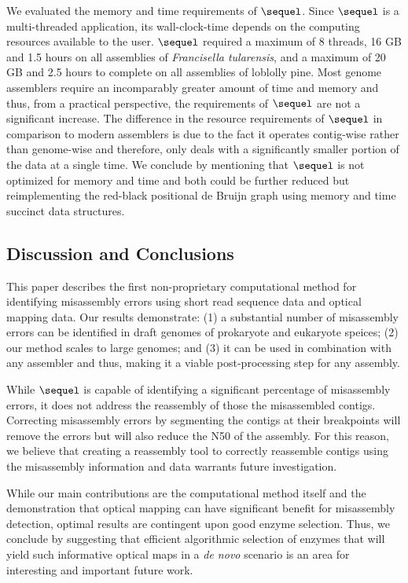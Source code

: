\documentclass[doctor]{thesis}
\begin{document}
We evaluated the memory and time requirements of $\sequel$.   Since $\sequel$ is a multi-threaded application, its wall-clock-time depends on the computing resources available to the user.  
$\sequel$ required a maximum of 8 threads, 16 GB and 1.5 hours on all assemblies of {\em  Francisella tularensis}, and a maximum of 20 GB and 2.5 hours to complete on all assemblies of loblolly pine.
Most genome assemblers require an incomparably greater amount of time and memory and thus, from a practical perspective, the requirements of $\sequel$ are not a significant increase.  
The difference in the resource requirements of $\sequel$ in comparison to modern assemblers is due to the fact it operates contig-wise rather than genome-wise and therefore, only deals with a significantly smaller portion of the data at a single time.
We conclude by mentioning that $\sequel$ is not optimized for memory and time and both could be further reduced but reimplementing the red-black positional de Bruijn graph using memory and time succinct data structures. 

 
\makeatletter{}\subsection{Discussion and Conclusions} \label{sec:discussion} 

This paper describes the first non-proprietary computational method for identifying misassembly errors using short read sequence data and optical mapping data.
 Our results demonstrate: (1) a substantial number of misassembly errors can be identified in draft genomes of prokaryote and eukaryote speices; (2) our method scales to large genomes; and (3) it can be used in combination with any
 assembler and thus, making it a viable post-processing step for any assembly. 

While $\sequel$ is capable of identifying a significant percentage of misassembly errors, it does not address 
the reassembly of those the misassembled contigs. 
Correcting misassembly errors by segmenting the contigs at their breakpoints will remove the errors but will also 
reduce
the N50 
of the assembly.  
For this reason, we believe that creating a reassembly tool to correctly reassemble contigs using the misassembly information and data warrants future investigation.

While our main contributions are the computational method itself and the demonstration that optical mapping can have significant benefit for misassembly detection, optimal results are contingent upon good enzyme selection. 
Thus, we conclude by suggesting that efficient algorithmic selection of enzymes that will yield such informative optical maps in a {\em de novo} scenario is an area for interesting and important future work.  
\end{document}
